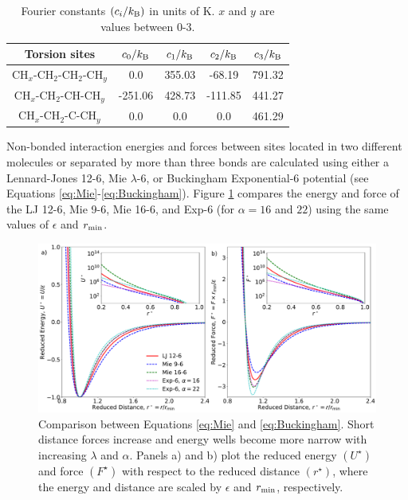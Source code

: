 \documentclass[preprint,letterpaper,floatfix,citeautoscript,aip,jcp]{revtex4-1}
\begin{document}
\begin{table}[h!]
	\caption{Fourier constants $(c_i/k_{\rm B})$ in units of K.\cite{Martin1999} $x$ and $y$ are values between 0-3.} \label{tab:torsions}
	\begin{center}
		\begin{tabular}{|c|c|c|c|c|}
			\hline
			Torsion sites & $c_0/k_{\rm B}$ & $c_1/k_{\rm B}$ & $c_2/k_{\rm B}$ & $c_3/k_{\rm B}$ \\ \hline
			CH$_x$-CH$_2$-CH$_2$-CH$_y$ & 0.0 & 355.03 & -68.19 & 791.32 \\ 
            CH$_x$-CH$_2$-CH-CH$_y$ & -251.06 & 428.73 & -111.85 & 441.27 \\
            CH$_x$-CH$_2$-C-CH$_y$ & 0.0 & 0.0 & 0.0 & 461.29 \\
			\hline
		\end{tabular}
	\end{center} 
\end{table}
Non-bonded interaction energies and forces between sites located in two different molecules or separated by more than three bonds are calculated using either a Lennard-Jones 12-6, Mie $\lambda$-6, or Buckingham Exponential-6 potential (see Equations \ref{eq:Mie}-\ref{eq:Buckingham}). Figure \ref{fig:UF_Mie_Exp6} compares the energy and force of the LJ 12-6, Mie 9-6, Mie 16-6, and Exp-6 (for $\alpha = 16$ and $22$) using the same values of $\epsilon$ and $r_{\rm min}$.

\begin{figure}[htb!]
	\centering
	\includegraphics[width=6.4in]{UF_Mie_Exp6}
	\caption{Comparison between Equations \ref{eq:Mie} and \ref{eq:Buckingham}. Short distance forces increase and energy wells become more narrow with increasing $\lambda$ and $\alpha$. Panels a) and b) plot the reduced energy $(U^\star)$ and force $(F^\star)$ with respect to the reduced distance $(r^\star)$, where the energy and distance are scaled by $\epsilon$ and $r_{\rm min}$, respectively.}
	\label{fig:UF_Mie_Exp6}
\end{figure}
\end{document}
